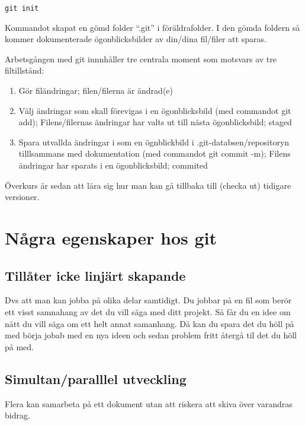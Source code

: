 \documentclass[
  letterpaper,
  DIV=11,
  numbers=noendperiod]{scrreprt}
\begin{document}
\begin{verbatim}
git init
\end{verbatim}

Kommandot skapat en gömd folder ``.git'' i föräldrafolder. I den gömda
foldern så kommer dokumenterade ögonblicksbilder av din/dina fil/filer
att sparas.

Arbetsgången med git innnhåller tre centrala moment som motsvars av tre
filtillstånd:

\begin{enumerate}
\def\labelenumi{\arabic{enumi}.}
\item
  Gör filändringar; filen/filerna är ändrad(e)
\item
  Välj ändringar som skall förevigas i en ögonblicksbild (med commandot
  git add); Filens/filernas ändringar har valts ut till nästa
  ögonblicksbild; staged
\item
  Spara utvallda ändringar i som en ögnblickbild i
  .git-databsen/repositoryn tilllsammans med dokumentation (med
  commandot git commit -m); Filens ändringar har sparats i en
  ögonblicksbild; commited
\end{enumerate}

Överkurs är sedan att lära sig hur man kan gå tillbaka till (checka ut)
tidigare versioner.

\section{Några egenskaper hos git}\label{nuxe5gra-egenskaper-hos-git}

\subsection{Tillåter icke linjärt
skapande}\label{tilluxe5ter-icke-linjuxe4rt-skapande}

Dvs att man kan jobba på olika delar samtidigt. Du jobbar på en fil som
berör ett visst samnahang av det du vill säga med ditt projekt. Så får
du en idee om nått du vill säga om ett helt annat samanhang. Då kan du
spara det du höll på med börja jobab med en nya ideen och sedan problem
fritt återgå til det du höll på med.

\subsection{Simultan/paralllel
utveckling}\label{simultanparalllel-utveckling}

Flera kan samarbeta på ett dokument utan att riskera att skiva över
varandras bidrag.
\end{document}
